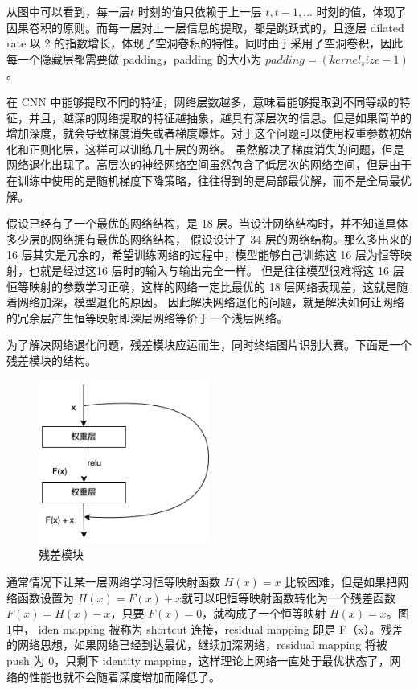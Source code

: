 从图中可以看到，每一层$t$ 时刻的值只依赖于上一层 $t, t - 1, \dots$ 时刻的值，体现了因果卷积的原则。而每一层对上一层信息的提取，都是跳跃式的，且逐层 dilated rate 以 2 的指数增长，体现了空洞卷积的特性。同时由于采用了空洞卷积，因此每一个隐藏层都需要做 padding，padding 的大小为 $padding = (kernel_size - 1)$。

在 CNN 中能够提取不同的特征，网络层数越多，意味着能够提取到不同等级的特征，并且，越深的网络提取的特征越抽象，越具有深层次的信息。但是如果简单的增加深度，就会导致梯度消失或者梯度爆炸。对于这个问题可以使用权重参数初始化和正则化层，这样可以训练几十层的网络\cite{吕国豪2014基于卷积神经网络的正则化方法}。
虽然解决了梯度消失的问题，但是网络退化出现了。高层次的神经网络空间虽然包含了低层次的网络空间，但是由于在训练中使用的是随机梯度下降策略，往往得到的是局部最优解，而不是全局最优解。

假设已经有了一个最优的网络结构，是 18 层。当设计网络结构时，并不知道具体多少层的网络拥有最优的网络结构，
假设设计了 34 层的网络结构。那么多出来的 16 层其实是冗余的，希望训练网络的过程中，模型能够自己训练这 16 层为恒等映射，也就是经过这16 层时的输入与输出完全一样。
但是往往模型很难将这 16 层恒等映射的参数学习正确，这样的网络一定比最优的 18 层网络表现差，这就是随着网络加深，模型退化的原因。
因此解决网络退化的问题，就是解决如何让网络的冗余层产生恒等映射即深层网络等价于一个浅层网络。

为了解决网络退化问题，残差模块应运而生，同时终结图片识别大赛。下面是一个残差模块的结构。

\begin{figure}[htbp]
  \centering
  \includegraphics[width=0.5\textwidth]{figures/residual_block.png}
  \caption{残差模块}
  \label{residual_block}
\end{figure}

通常情况下让某一层网络学习恒等映射函数 $H(x) = x$ 比较困难，但是如果把网络函数设置为 $H(x) = F(x) + x$就可以吧恒等映射函数转化为一个残差函数 $F(x) = H(x) - x$，只要 $F(x) = 0$，就构成了一个恒等映射 $H(x) = x$。图\ref{residual_block}中，
iden mapping 被称为 shortcut 连接，residual mapping 即是 F（x）。残差的网络思想，如果网络已经到达最优，继续加深网络，residual mapping 将被 push 为 0，只剩下 identity mapping，这样理论上网络一直处于最优状态了，网络的性能也就不会随着深度增加而降低了。


